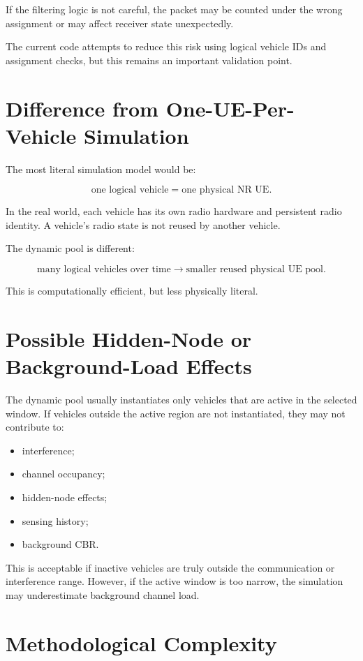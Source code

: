 \documentclass[11pt]{article}
\begin{document}
If the filtering logic is not careful, the packet may be counted under the wrong assignment or may affect receiver state unexpectedly.

The current code attempts to reduce this risk using logical vehicle IDs and assignment checks, but this remains an important validation point.

\section{Difference from One-UE-Per-Vehicle Simulation}

The most literal simulation model would be:

\[
\text{one logical vehicle} = \text{one physical NR UE}.
\]

In the real world, each vehicle has its own radio hardware and persistent radio identity. A vehicle's radio state is not reused by another vehicle.

The dynamic pool is different:

\[
\text{many logical vehicles over time} \rightarrow \text{smaller reused physical UE pool}.
\]

This is computationally efficient, but less physically literal.

\section{Possible Hidden-Node or Background-Load Effects}

The dynamic pool usually instantiates only vehicles that are active in the selected window. If vehicles outside the active region are not instantiated, they may not contribute to:

\begin{itemize}
    \item interference;
    \item channel occupancy;
    \item hidden-node effects;
    \item sensing history;
    \item background CBR.
\end{itemize}

This is acceptable if inactive vehicles are truly outside the communication or interference range. However, if the active window is too narrow, the simulation may underestimate background channel load.

\section{Methodological Complexity}
\end{document}
